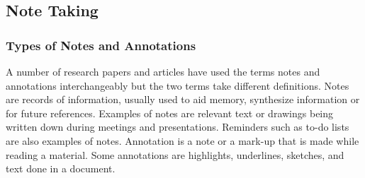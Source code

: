 %
%
%                 

 

\subsection{Note Taking}
\label{sec:notetaking}

\subsubsection{Types of Notes and Annotations}

A number of research papers and articles have used the terms notes and annotations interchangeably but the two terms take different definitions. Notes are records of information, usually used to aid memory, synthesize information or for future references. Examples of notes are relevant text or drawings being written down during meetings and presentations. Reminders such as to-do lists are also examples of notes. Annotation is a note or a mark-up that is made while reading a material. Some annotations are highlights, underlines, sketches, and text done in a document.

